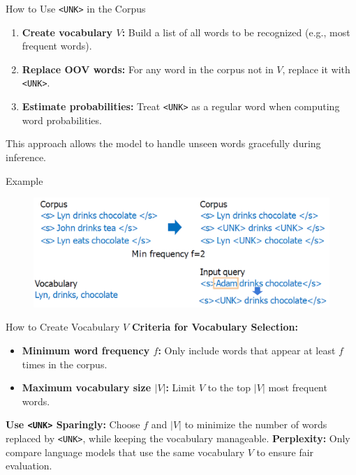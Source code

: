 \begin{frame}{How to Use \texttt{<UNK>} in the Corpus}
    \begin{enumerate}
        \item \textbf{Create vocabulary $V$:} Build a list of all words to be recognized (e.g., most frequent words).
        \item \textbf{Replace OOV words:} For any word in the corpus not in $V$, replace it with \texttt{<UNK>}.
        \item \textbf{Estimate probabilities:} Treat \texttt{<UNK>} as a regular word when computing word probabilities.
    \end{enumerate}
    \vspace{1em}
    This approach allows the model to handle unseen words gracefully during inference.
\end{frame}

\begin{frame}{Example}
    \begin{figure}
        \centering
        \includegraphics[width=\textwidth,height=0.8\textheight,keepaspectratio]{images/nlp-intro/oov-unk.png}
    \end{figure}
\end{frame}

\begin{frame}{How to Create Vocabulary $V$}
    \textbf{Criteria for Vocabulary Selection:}
    \begin{itemize}
        \item \textbf{Minimum word frequency $f$:} Only include words that appear at least $f$ times in the corpus.
        \item \textbf{Maximum vocabulary size $|V|$:} Limit $V$ to the top $|V|$ most frequent words.
    \end{itemize}
    \vspace{1em}
    \textbf{Use \texttt{<UNK>} Sparingly:} Choose $f$ and $|V|$ to minimize the number of words replaced by \texttt{<UNK>}, while keeping the vocabulary manageable.
    \vspace{1em}
    \textbf{Perplexity:} Only compare language models that use the same vocabulary $V$ to ensure fair evaluation.
\end{frame}